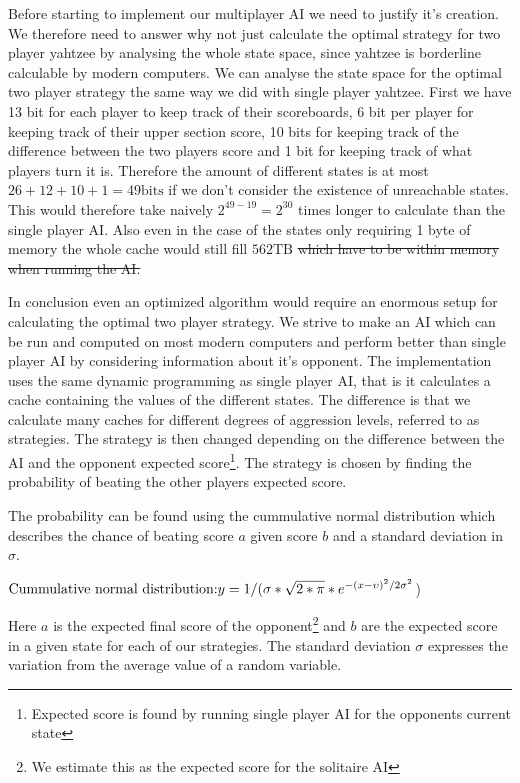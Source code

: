 Before starting to implement our multiplayer AI we need to justify it's creation. We therefore need to answer why not just calculate the optimal strategy for two player yahtzee by analysing the whole state space, since yahtzee is borderline calculable by modern computers. We can analyse the state space for the optimal two player strategy the same way we did with single player yahtzee. First we have 13 bit for each player to keep track of their scoreboards, 6 bit per player for keeping track of their upper section score, 10 bits for keeping track of the difference between the two players score and 1 bit for keeping track of what players turn it is. Therefore the amount of different states is at most $26+12+10+1 = 49\mbox{bits}$ if we don't consider the existence of unreachable states. This would therefore take naively $2^{49-19} = 2^{30}$ times longer to calculate than the single player AI. Also even in the case of the states only requiring 1 byte of memory the whole cache would still fill $562 \mbox{TB}$ \st{which have to be within memory when running the AI.} 

In conclusion even an optimized algorithm would require an enormous setup for calculating the optimal two player strategy. We strive to make an AI which can be run and computed on most modern computers and perform better than single player AI by considering information about it's opponent. The implementation uses the same dynamic programming as single player AI, that is it calculates a cache containing the values of the different states. The difference is that we calculate many caches for different degrees of aggression levels, referred to as strategies. The strategy is then changed depending on the difference between the AI and the opponent expected score\footnote{Expected score is found by running single player AI for the opponents current state}. The strategy is chosen by finding the probability of beating the other players expected score. 

The probability can be found using the cummulative normal distribution which describes the chance of beating score $a$ given score $b$ and a standard deviation in  $\sigma$. %

$\newline\mbox{Cummulative normal distribution:} \newline y = 1  /(\sigma * \sqrt{2 * \pi} * e^{-(x - \upsilon)^2 / 2 \sigma^2}$)\newline

Here $a$ is the expected final score of the opponent\footnote{We estimate this as the expected score for the solitaire AI} and $b$ are the expected score in a given state for each of our strategies. The standard deviation $\sigma$ expresses the variation from the average value of a random variable.  

